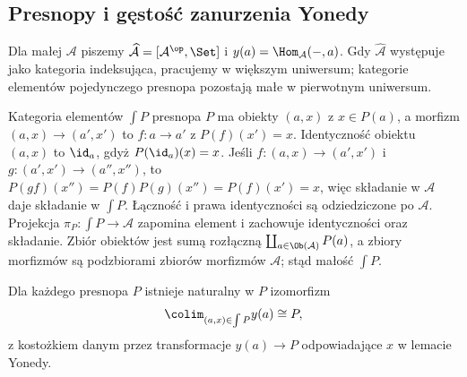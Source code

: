 \subsection{Presnopy i gęstość zanurzenia Yonedy}
Dla małej $\mathcal A$ piszemy $\widehat{\mathcal A}=[\mathcal A^{\op},\Set]$ i $y(a)=\Hom_{\mathcal A}(-,a)$. Gdy $\widehat{\mathcal A}$ występuje jako kategoria indeksująca, pracujemy w większym uniwersum; kategorie elementów pojedynczego presnopa pozostają małe w pierwotnym uniwersum.
\begin{definicja}\label{cat:def:kan-elements}
Kategoria elementów $\int P$ presnopa $P$ ma obiekty $(a,x)$ z $x\in P(a)$, a morfizm $(a,x)\to(a',x')$ to $f:a\to a'$ z $P(f)(x')=x$. Identyczność obiektu $(a,x)$ to $\id_a$, gdyż $P(\id_a)(x)=x$. Jeśli $f:(a,x)\to(a',x')$ i $g:(a',x')\to(a'',x'')$, to $P(gf)(x'')=P(f)P(g)(x'')=P(f)(x')=x$, więc składanie w $\mathcal A$ daje składanie w $\int P$. Łączność i prawa identyczności są odziedziczone po $\mathcal A$. Projekcja $\pi_P:\int P\to\mathcal A$ zapomina element i zachowuje identyczności oraz składanie. Zbiór obiektów jest sumą rozłączną $\coprod_{a\in\Ob(\mathcal A)}P(a)$, a zbiory morfizmów są podzbiorami zbiorów morfizmów $\mathcal A$; stąd małość $\int P$.
\end{definicja}
\begin{twierdzenie}\label{cat:thm:kan-yoneda-density}
Dla każdego presnopa $P$ istnieje naturalny w $P$ izomorfizm
\[
 \colim_{(a,x)\in\int P}y(a)\cong P,
\]
z kostożkiem danym przez transformacje $y(a)\to P$ odpowiadające $x$ w lemacie Yonedy.
\end{twierdzenie}
